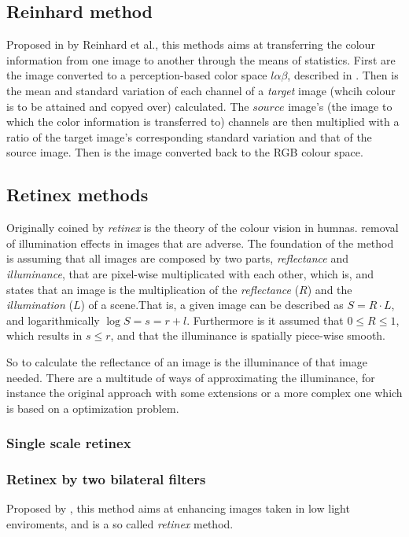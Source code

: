 \documentclass{IEEEtran}
\begin{document}
\subsection{Reinhard method}

Proposed in \cite{Reinhard} by Reinhard et al., this methods aims at transferring the colour information from one image to another through the means of statistics. First are the image converted to a perception-based color space $l\alpha\beta$, described in \cite{ruderman_98}. Then is the mean and standard variation of each channel of a \emph{target} image (whcih colour is to be attained and copyed over) calculated. The $source$ image's (the image to which the color information is transferred to) channels are then multiplied with a ratio of the target image's corresponding standard variation and that of the source image. Then is the image converted back to the RGB colour space.
\subsection{Retinex methods}

Originally coined by \cite{Land1971LightnessAR} \emph{retinex} is the theory of the colour vision in humnas. removal of illumination effects in images that are adverse. The foundation of the method is assuming that all images are composed by two parts, \emph{reflectance} and \emph{illuminance}, that are pixel-wise multiplicated with each other, which is, and states that an image is the multiplication of the \emph{reflectance} ($R$) and the \emph{illumination} ($L$) of a scene.That is, a given image can be described as $S = R \cdot L$, and logarithmically $\log{S}  = s = r + l$. Furthermore is it assumed that $0 \leq R \leq 1$, which results in $s \le r$, and that the illuminance is spatially piece-wise smooth.

So to calculate the reflectance of an image is the illuminance of that image needed. There are a multitude of ways of approximating the illuminance, for instance the original approach with some extensions \cite{retinex_Parihar} or a more complex one \cite{retinex_by_two_elad_michael_2005} which is based on a optimization problem.

\subsubsection{Single scale retinex}



\subsubsection{Retinex by two bilateral filters}
Proposed by \cite{retinex_by_two_elad_michael_2005}, this method aims at enhancing images taken in low light enviroments, and is a so called \emph{retinex} method.
\end{document}
